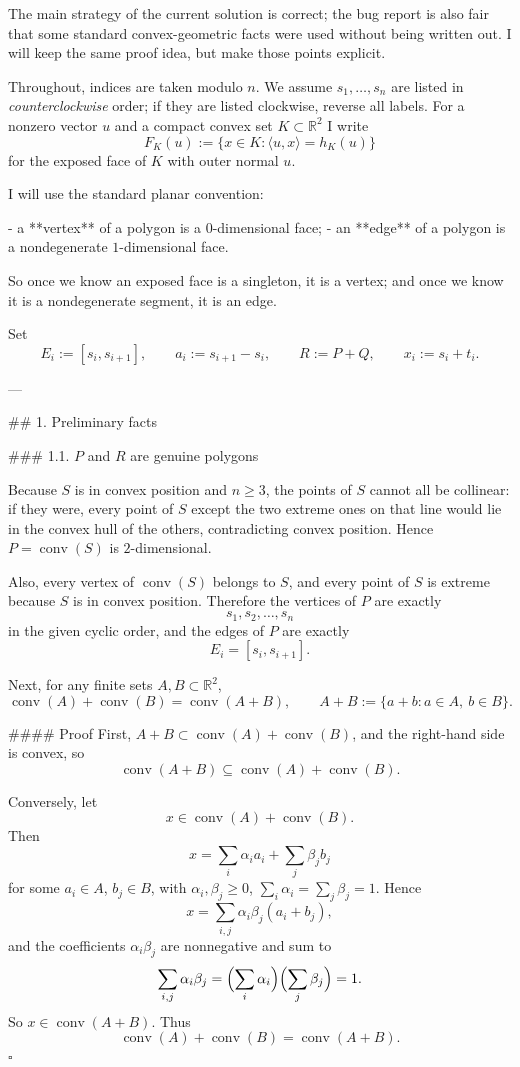 The main strategy of the current solution is correct; the bug report is also fair that some standard convex-geometric facts were used without being written out. I will keep the same proof idea, but make those points explicit.

Throughout, indices are taken modulo \(n\). We assume \(s_1,\dots,s_n\) are listed in \emph{counterclockwise} order; if they are listed clockwise, reverse all labels. For a nonzero vector \(u\) and a compact convex set \(K\subset \mathbb R^2\) I write
\[
F_K(u):=\{x\in K:\langle u,x\rangle=h_K(u)\}
\]
for the exposed face of \(K\) with outer normal \(u\).

I will use the standard planar convention:

- a **vertex** of a polygon is a \(0\)-dimensional face;
- an **edge** of a polygon is a nondegenerate \(1\)-dimensional face.

So once we know an exposed face is a singleton, it is a vertex; and once we know it is a nondegenerate segment, it is an edge.

Set
\[
E_i:=[s_i,s_{i+1}],\qquad a_i:=s_{i+1}-s_i,\qquad R:=P+Q,\qquad x_i:=s_i+t_i .
\]

---

## 1. Preliminary facts

### 1.1. \(P\) and \(R\) are genuine polygons

Because \(S\) is in convex position and \(n\ge 3\), the points of \(S\) cannot all be collinear: if they were, every point of \(S\) except the two extreme ones on that line would lie in the convex hull of the others, contradicting convex position. Hence \(P=\operatorname{conv}(S)\) is \(2\)-dimensional.

Also, every vertex of \(\operatorname{conv}(S)\) belongs to \(S\), and every point of \(S\) is extreme because \(S\) is in convex position. Therefore the vertices of \(P\) are exactly
\[
s_1,s_2,\dots,s_n
\]
in the given cyclic order, and the edges of \(P\) are exactly
\[
E_i=[s_i,s_{i+1}].
\]

Next, for any finite sets \(A,B\subset \mathbb R^2\),
\[
\operatorname{conv}(A)+\operatorname{conv}(B)=\operatorname{conv}(A+B),
\qquad A+B:=\{a+b:a\in A,\ b\in B\}.
\]

#### Proof
First, \(A+B\subset \operatorname{conv}(A)+\operatorname{conv}(B)\), and the right-hand side is convex, so
\[
\operatorname{conv}(A+B)\subseteq \operatorname{conv}(A)+\operatorname{conv}(B).
\]

Conversely, let
\[
x\in \operatorname{conv}(A)+\operatorname{conv}(B).
\]
Then
\[
x=\sum_i \alpha_i a_i+\sum_j \beta_j b_j
\]
for some \(a_i\in A\), \(b_j\in B\), with \(\alpha_i,\beta_j\ge 0\), \(\sum_i\alpha_i=\sum_j\beta_j=1\). Hence
\[
x=\sum_{i,j}\alpha_i\beta_j(a_i+b_j),
\]
and the coefficients \(\alpha_i\beta_j\) are nonnegative and sum to
\[
\sum_{i,j}\alpha_i\beta_j=\Bigl(\sum_i\alpha_i\Bigr)\Bigl(\sum_j\beta_j\Bigr)=1.
\]
So \(x\in \operatorname{conv}(A+B)\). Thus
\[
\operatorname{conv}(A)+\operatorname{conv}(B)=\operatorname{conv}(A+B).
\]
\(\square\)

